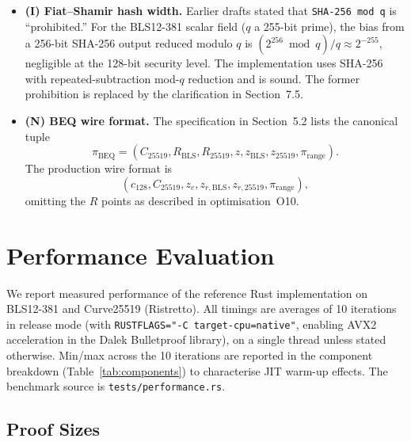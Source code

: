 \documentclass[11pt]{article}
\theoremstyle{definitionstyle}
\theoremstyle{plain}
\begin{document}
\begin{itemize}[leftmargin=*]
\item \textbf{(I) Fiat--Shamir hash width.}
  Earlier drafts stated that \texttt{SHA-256~mod~q} is ``prohibited.''  For
  the BLS12-381 scalar field ($q$ a 255-bit prime), the bias from a 256-bit
  SHA-256 output reduced modulo $q$ is $(2^{256} \bmod q)/q \approx 2^{-255}$,
  negligible at the 128-bit security level.  The implementation uses SHA-256
  with repeated-subtraction mod-$q$ reduction and is sound.  The former
  prohibition is replaced by the clarification in Section~7.5.

\item \textbf{(N) BEQ wire format.}
  The specification in Section~5.2 lists the canonical tuple
  \[
  \pi_{\text{BEQ}} = (C_{25519}, R_{\text{BLS}}, R_{25519}, z, z_{\text{BLS}}, z_{25519}, \pi_{\text{range}}).
  \]
  The production wire format is
  \[
  (c_{128}, C_{25519}, z_e, z_{r,\text{BLS}}, z_{r,25519}, \pi_{\text{range}}),
  \]
  omitting the $R$ points as described in optimisation~O10.

\end{itemize}

\section{Performance Evaluation}
\label{sec:performance}

We report measured performance of the reference Rust implementation on BLS12-381
and Curve25519 (Ristretto).  All timings are averages of 10 iterations in
release mode (with \nolinkurl{RUSTFLAGS="-C target-cpu=native"}, enabling AVX2
acceleration in the Dalek Bulletproof library), on a single thread unless stated
otherwise.  Min/max across the 10 iterations are reported in the component
breakdown (Table~\ref{tab:components}) to characterise JIT warm-up effects.
The benchmark source is \nolinkurl{tests/performance.rs}.

\subsection{Proof Sizes}
\end{document}
